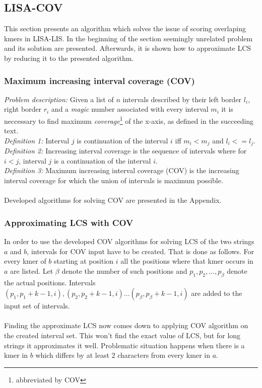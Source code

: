 \documentclass[times, utf8, diplomski]{fer}
\begin{document}
\subsection{LISA-COV}

This section presents an algorithm which solves the issue of scoring overlaping kmers in LISA-LIS. In the beginning of the section seemingly unrelated problem and its solution are presented. Afterwards, it is shown how to approximate LCS by reducing it to the presented algorithm.

\subsubsection{Maximum increasing interval coverage (COV)}

\emph{Problem description: } Given a list of $n$ intervals described by their left border $l_i$, right border $r_i$ and a \emph{magic} number associated with every interval $m_i$ it is neccessary to find maximum \emph{coverage}\footnote{abbreviated by COV} of the x-axis, as defined in the succeeding text.\\
\emph{Definition 1: } Interval $j$ is continuation of the interval $i$ iff $m_i<m_j$ and $l_i <= l_j$.\\
\emph{Definition 2: } Increasing interval coverage is the sequence of intervals where for $i<j$, interval $j$ is a continuation of the interval $i$.\\
\emph{Definition 3: } Maximum increasing interval coverage (COV) is the increasing interval coverage for which the union of intervals is maximum possible.\\
\\
Developed algorithms for solving COV are presented in the Appendix.

\subsubsection{Approximating LCS with COV}

In order to use the developed COV algorithms for solving LCS of the two strings $a$ and $b$, intervals for COV input have to be created. That is done as follows. For every kmer of $b$ starting at position $i$ all the positions where that kmer occurs in $a$ are listed. Let $\beta$ denote the number of such positions and $p_1,p_2,...,p_\beta$ denote the actual positions. Intervals $(p_1,p_1+k-1,i),(p_2,p_2+k-1,i)...(p_\beta, p_\beta+k-1,i)$ are added to the input set of intervals.\\
\\
Finding the approximate LCS now comes down to applying COV algorithm on the created interval set. This won't find the exact value of LCS, but for long strings it approximates it well. Problematic situation happens when there is a kmer in $b$ which differs by at least 2 characters from every kmer in $a$.
\end{document}
